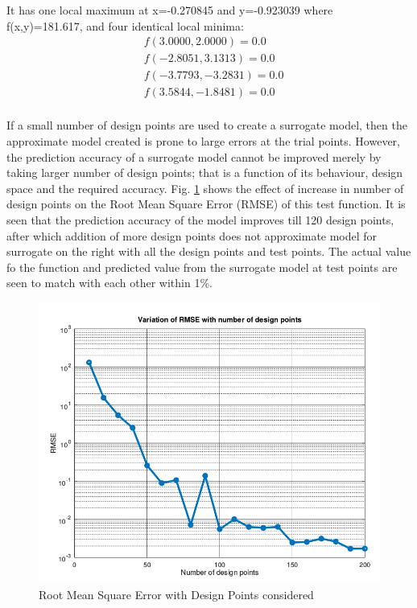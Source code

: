 It has one local maximum at x=-0.270845 and y=-0.923039 where f(x,y)=181.617, and four identical local minima:
\begin{align}
&f( 3.0000 , 2.0000 )=0.0 \\
&f( -2.8051 , 3.1313 )=0.0 \\
&f( -3.7793 , -3.2831 )=0.0 \\
&f( 3.5844 , -1.8481 )=0.0 \\
\end{align}

If a small number of design points are used to create a surrogate model, then the approximate model created is prone to large errors at the trial points. However, the prediction accuracy of a surrogate model cannot be improved merely by taking larger number of design points; that is a function of its behaviour, design space and the required accuracy. Fig. \ref{fig:Root Mean Square Error with Design Points considered} shows the effect of increase in number of design points on the Root Mean Square Error (RMSE) of this test function. It is seen that the prediction accuracy of the model improves till 120 design points, after which addition of more design points does not approximate model for surrogate on the right with all the design points and test points. The actual value fo the function and predicted value from the surrogate model at test points are seen to match with each other within 1\%.

\begin{figure}[H]
	\includegraphics[width=\textwidth]{optimization/RMSE_analysis.png}
	\caption{Root Mean Square Error with Design Points considered}
	\label{fig:Root Mean Square Error with Design Points considered} %
\end{figure}



